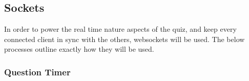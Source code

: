\subsection{Sockets} %
\label{sub:sockets}
In order to power the real time nature aspects of the quiz, and keep every connected client in sync with the others, websockets will be used. The below processes outline exactly how they will be used.

\subsubsection{Question Timer} %
\label{ssub:question_timer}

